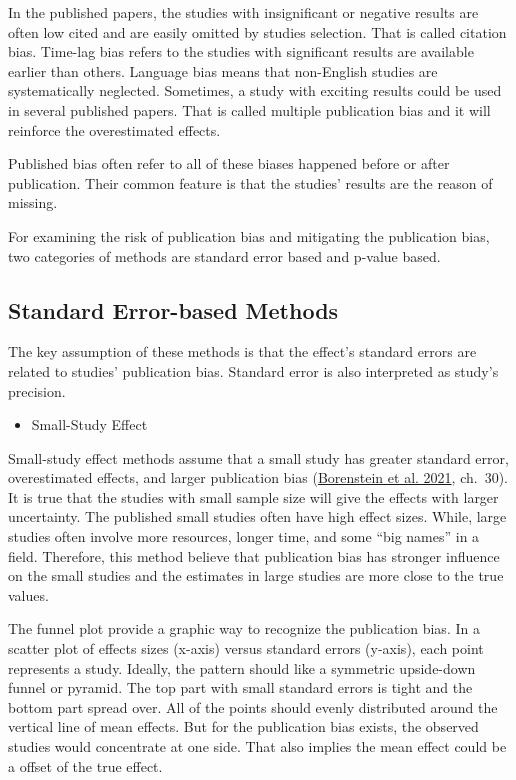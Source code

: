 \documentclass[
  11pt,
  openany]{memoir}
\providecommand{\tightlist}{%
  \setlength{\itemsep}{0pt}\setlength{\parskip}{0pt}}
\begin{document}
In the published papers, the studies with insignificant or negative results are often low cited and are easily omitted by studies selection.
That is called citation bias.
Time-lag bias refers to the studies with significant results are available earlier than others.
Language bias means that non-English studies are systematically neglected.
Sometimes, a study with exciting results could be used in several published papers. That is called multiple publication bias and it will reinforce the overestimated effects.

Published bias often refer to all of these biases happened before or after publication.
Their common feature is that the studies' results are the reason of missing.

For examining the risk of publication bias and mitigating the publication bias, two categories of methods are standard error based and p-value based.

\hypertarget{standard-error-based-methods}{%
\subsection{Standard Error-based Methods}\label{standard-error-based-methods}}

The key assumption of these methods is that the effect's standard errors are related to studies' publication bias.
Standard error is also interpreted as study's precision.

\begin{itemize}
\tightlist
\item
  Small-Study Effect
\end{itemize}

Small-study effect methods assume that a small study has greater standard error, overestimated effects, and larger publication bias (\protect\hyperlink{ref-borensteinIntroductionMetaAnalysis2021}{Borenstein et al. 2021}, ch.~30).
It is true that the studies with small sample size will give the effects with larger uncertainty.
The published small studies often have high effect sizes.
While, large studies often involve more resources, longer time, and some ``big names'' in a field.
Therefore, this method believe that publication bias has stronger influence on the small studies and the estimates in large studies are more close to the true values.

The funnel plot provide a graphic way to recognize the publication bias.
In a scatter plot of effects sizes (x-axis) versus standard errors (y-axis), each point represents a study.
Ideally, the pattern should like a symmetric upside-down funnel or pyramid. The top part with small standard errors is tight and the bottom part spread over. All of the points should evenly distributed around the vertical line of mean effects.
But for the publication bias exists, the observed studies would concentrate at one side. That also implies the mean effect could be a offset of the true effect.
\end{document}
